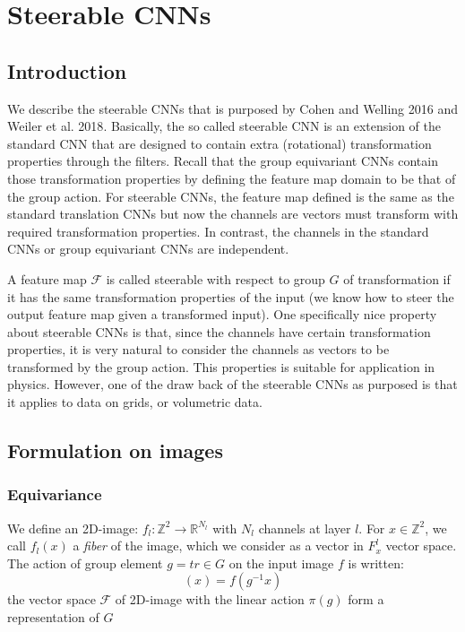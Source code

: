 \documentclass{article}
\newcommand{\bbz}{\mathbb{Z}}
\newcommand{\bbr}{\mathbb{R}}
\newcommand{\calf}{\mathcal{F}}
\begin{document}
\section{Steerable CNNs}
\subsection{Introduction}
We describe the steerable CNNs that is purposed by Cohen and Welling 2016\cite{CW2016} and Weiler et al. 2018\cite{W2018_3D, W2018_Learning}. 
Basically, the so called steerable CNN is an extension of the standard CNN that are designed to contain extra (rotational) transformation properties through the filters.
Recall that the group equivariant CNNs contain those transformation properties by defining the feature map domain to be that of the group action. 
For steerable CNNs, the feature map defined is the same as the standard translation CNNs but now the channels are vectors must 
transform with required transformation properties. 
In contrast, the channels in the standard CNNs or group equivariant CNNs are independent.

A feature map $\calf$ is called steerable with respect to group $G$ of transformation if it has the same transformation properties of the input
(we know how to steer the output feature map given a transformed input).
One specifically nice property about steerable CNNs is that, since the channels have certain transformation properties, it is very natural 
to consider the channels as vectors to be transformed by the group action. This properties is suitable for application in physics. 
However, one of the draw back of the steerable CNNs as purposed is that it applies to data on grids, or volumetric data.

\subsection{Formulation on images}
\subsubsection*{Equivariance}
We define an 2D-image: $f_l\colon \bbz^2 \to \bbr^{N_l}$ with $N_l$ channels at layer $l$. For $x\in \bbz^2$, we call $f_l(x)$ a \emph{fiber}
of the image, which we consider as a vector in $F_x^l$ vector space. 
The action of group element $g=tr \in G$ on the input image $f$ is written:
\begin{equation}
    [\pi(g) f](x) = f(g^{-1}x)
    \label{E:representation_on_input}
\end{equation}
the vector space $\calf$ of 2D-image with the linear action $\pi(g)$ form a representation of $G$
\end{document}
